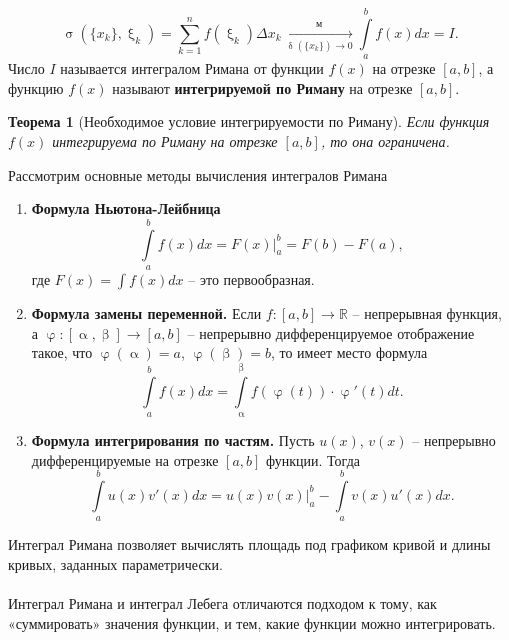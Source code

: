 \documentclass[a4paper, 12pt]{report}
\numberwithin{equation}{section}
\renewcommand{\alpha}{\upalpha}
\renewcommand{\beta}{\upbeta}
\renewcommand{\delta}{\updelta}
\renewcommand{\varphi}{\upvarphi}
\renewcommand{\sigma}{\upsigma}
\renewcommand{\xi}{\upxi}
\newtheorem*{theorem}{Теорема}
\begin{document}
	\begin{equation*}
		\sigma(\{x_k\}, \xi_k) = \sum_{k=1}^n f(\xi_k)\Delta x_k \xrightarrow[ \delta (\{x_k\}) \to 0]{м} \int\limits_a^b f(x)dx = I.
	\end{equation*}
	Число $I$ называется интегралом Римана от функции $f(x)$ на отрезке $[a,b]$, а функцию $f(x)$ называют \textbf{интегрируемой по Риману} на отрезке $[a,b]$.
	\begin{theorem}
		[Необходимое условие интегрируемости по Риману]
		Если функция $f(x)$ интегрируема по Риману на отрезке $[a,b]$, то она ограничена.
	\end{theorem}
	\noindent
	Рассмотрим основные методы вычисления интегралов Римана
	\begin{enumerate}
		\item \textbf{Формула Ньютона-Лейбница}
		\begin{equation}
			\int\limits_a^b f(x)dx = F(x)\Big|_a^b= F(b) - F(a),
		\end{equation}
		где $F(x) = \int f(x)dx$ -- это первообразная.
		\item \textbf{Формула замены переменной.} Если $f:[a,b] \to \mathbb R$ -- непрерывная функция, а $\varphi : [\alpha, \beta]\to [a,b]$ -- непрерывно дифференцируемое отображение такое, что $\varphi(\alpha) = a$, $\varphi(\beta) = b$, то имеет место формула
		\begin{equation}
			\int\limits_a^b f(x)dx = \int\limits_\alpha^\beta f(\varphi(t))\cdot \varphi'(t)dt.
		\end{equation}
		\item \textbf{Формула интегрирования по частям.} Пусть $u(x)$, $v(x)$ -- непрерывно дифференцируемые на отрезке $[a,b]$ функции. Тогда
		\begin{equation}
			\int\limits_a^b u(x)v'(x)dx = u(x)v(x)\Big|_a^b - \int\limits_a^b v(x)u'(x)dx.
		\end{equation}
	\end{enumerate}
	Интеграл Римана позволяет вычислять площадь под графиком кривой и длины кривых, заданных параметрически.
	\\\\
	Интеграл Римана и интеграл Лебега отличаются подходом к тому, как «суммировать» значения функции, и тем, какие функции можно интегрировать.
\end{document}
